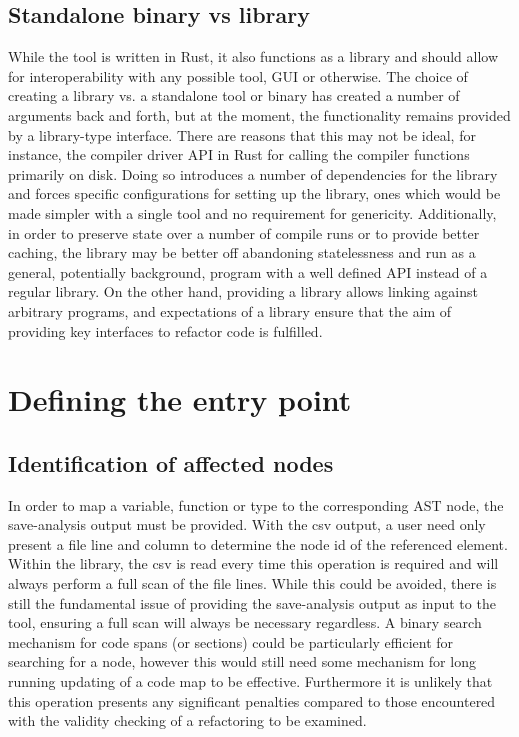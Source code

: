 \subsection{Standalone binary vs library}
While the tool is written in Rust, it also functions as a library and should allow for interoperability with any possible tool, GUI or otherwise. The choice of creating a library vs. a standalone tool or binary has created a number of arguments back and forth, but at the moment, the functionality remains provided by a library-type interface. There are reasons that this may not be ideal, for instance, the compiler driver API in Rust for calling the compiler functions primarily on disk. Doing so introduces a number of dependencies for the library and forces specific configurations for setting up the library, ones which would be made simpler with a single tool and no requirement for genericity. Additionally, in order to preserve state over a number of compile runs or to provide better caching, the library may be better off abandoning statelessness and run as a general, potentially background, program with a well defined API instead of a regular library. On the other hand, providing a library allows linking against arbitrary programs, and expectations of a library ensure that the aim of providing key interfaces to refactor code is fulfilled.


\section{Defining the entry point}
\subsection{Identification of affected nodes}
In order to map a variable, function or type to the corresponding AST node, the save-analysis output must be provided. With the csv output, a user need only present a file line and column to determine the node id of the referenced element. Within the library, the csv is read every time this operation is required and will always perform a full scan of the file lines. While this could be avoided, there is still the fundamental issue of providing the save-analysis output as input to the tool, ensuring a full scan will always be necessary regardless. A binary search mechanism for code spans (or sections) could be particularly efficient for searching for a node, however this would still need some mechanism for long running updating of a code map to be effective. Furthermore it is unlikely that this operation presents any significant penalties compared to those encountered with the validity checking of a refactoring to be examined.

